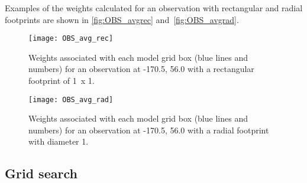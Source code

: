 \documentclass[../main/NEMO_manual]{subfiles}
\begin{document}
Examples of the weights calculated for an observation with rectangular and radial footprints are shown in
\autoref{fig:OBS_avgrec} and~\autoref{fig:OBS_avgrad}.

\begin{figure}
  \centering
  \texttt{[image: OBS\_avg\_rec]}
  \caption[Observational weights with a rectangular footprint]{
    Weights associated with each model grid box (blue lines and numbers)
    for an observation at -170.5, 56.0 with a rectangular footprint of 1\deg\ x 1\deg.}
  \label{fig:OBS_avgrec}
\end{figure}

\begin{figure}
  \centering
  \texttt{[image: OBS\_avg\_rad]}
  \caption[Observational weights with a radial footprint]{
    Weights associated with each model grid box (blue lines and numbers)
    for an observation at -170.5, 56.0 with a radial footprint with diameter 1\deg.}
  \label{fig:OBS_avgrad}
\end{figure}

\subsection{Grid search}
\end{document}
